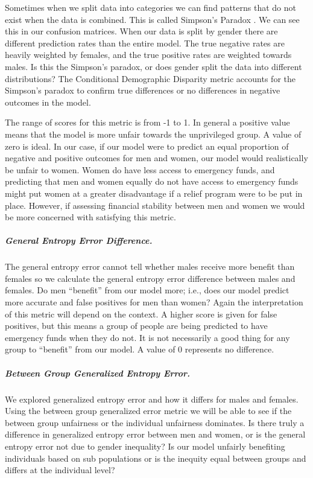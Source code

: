 \documentclass[water,article,submit,moreauthors,pdftex]{mdpi}
\begin{document}
Sometimes when we split data into categories we can find patterns that
do not exist when the data is combined. This is called Simpson's Paradox
\citep{mehrabi2021survey}. We can see this in our confusion matrices.
When our data is split by gender there are different prediction rates
than the entire model. The true negative rates are heavily weighted by
females, and the true positive rates are weighted towards males. Is this
the Simpson's paradox, or does gender split the data into different
distributions? The Conditional Demographic Disparity metric accounts for
the Simpson's paradox to confirm true differences or no differences in
negative outcomes in the model.

The range of scores for this metric is from -1 to 1. In general a
positive value means that the model is more unfair towards the
unprivileged group. A value of zero is ideal. In our case, if our model
were to predict an equal proportion of negative and positive outcomes
for men and women, our model would realistically be unfair to women.
Women do have less access to emergency funds, and predicting that men
and women equally do not have access to emergency funds might put women
at a greater disadvantage if a relief program were to be put in place.
However, if assessing financial stability between men and women we would
be more concerned with satisfying this metric.

\hypertarget{general-entropy-error-difference.}{%
\subparagraph{General Entropy Error
Difference.}\label{general-entropy-error-difference.}}

The general entropy error cannot tell whether males receive more benefit
than females so we calculate the general entropy error difference
between males and females. Do men ``benefit'' from our model more; i.e.,
does our model predict more accurate and false positives for men than
women? Again the interpretation of this metric will depend on the
context. A higher score is given for false positives, but this means a
group of people are being predicted to have emergency funds when they do
not. It is not necessarily a good thing for any group to ``benefit''
from our model. A value of 0 represents no difference.

\hypertarget{between-group-generalized-entropy-error.}{%
\subparagraph{Between Group Generalized Entropy
Error.}\label{between-group-generalized-entropy-error.}}

We explored generalized entropy error and how it differs for males and
females. Using the between group generalized error metric we will be
able to see if the between group unfairness or the individual unfairness
dominates. Is there truly a difference in generalized entropy error
between men and women, or is the general entropy error not due to gender
inequality? Is our model unfairly benefiting individuals based on sub
populations or is the inequity equal between groups and differs at the
individual level?
\end{document}
